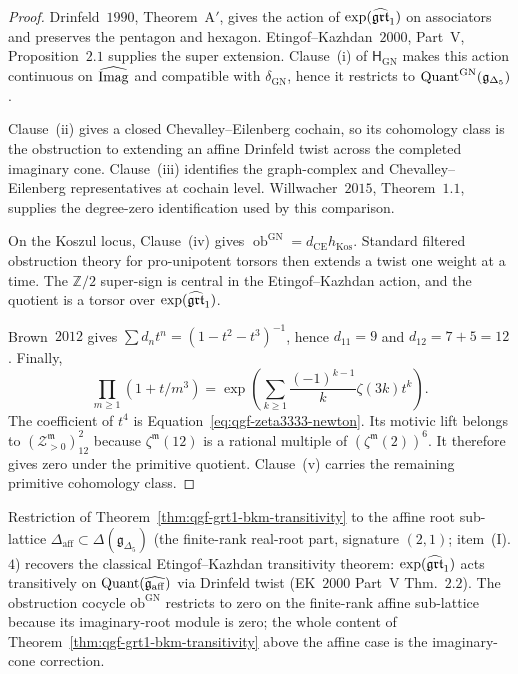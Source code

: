 \begin{proof}
Drinfeld~$1990$, Theorem~A$'$, gives the action of
$\exp(\widehat{\mathfrak{grt}}_1)$ on associators and preserves the pentagon and
hexagon.  Etingof--Kazhdan~$2000$, Part~V, Proposition~$2.1$ supplies
the super extension.  Clause~\textup{(i)} of
$\mathsf H_{\mathrm{GN}}$ makes this action continuous on
$\widehat{\mathrm{Imag}}$ and compatible with $\delta_{\mathrm{GN}}$, hence it
restricts to $\mathrm{Quant}^{\mathrm{GN}}(\mathfrak g_{\Delta_5})$.

Clause~\textup{(ii)} gives a closed Chevalley--Eilenberg cochain, so
its cohomology class is the obstruction to extending an affine
Drinfeld twist across the completed imaginary cone.  Clause~\textup{(iii)}
identifies the graph-complex and Chevalley--Eilenberg representatives
at cochain level.  Willwacher~$2015$, Theorem~$1.1$, supplies the
degree-zero identification used by this comparison.

On the Koszul locus, Clause~\textup{(iv)} gives
$\operatorname{ob}^{\mathrm{GN}}=d_{\mathrm{CE}}h_{\mathrm{Kos}}$.
Standard filtered obstruction theory for pro-unipotent torsors then
extends a twist one weight at a time.  The $\mathbb Z/2$ super-sign is
central in the Etingof--Kazhdan action, and the quotient is a torsor
over $\exp(\widehat{\mathfrak{grt}}_1)$.

Brown~$2012$ gives
$\sum d_nt^n=(1-t^2-t^3)^{-1}$, hence
$d_{11}=9$ and $d_{12}=7+5=12$.  Finally,
\[
 \prod_{m\geq1}(1+t/m^3)
 =\exp\!\left(\sum_{k\geq1}
 \frac{(-1)^{k-1}}{k}\zeta(3k)t^k\right).
\]
The coefficient of $t^4$ is
Equation~\eqref{eq:qgf-zeta3333-newton}.  Its motivic lift belongs to
$(\mathcal Z^{\mathfrak m}_{>0})^2_{12}$ because
$\zeta^{\mathfrak m}(12)$ is a rational multiple of
$(\zeta^{\mathfrak m}(2))^6$.  It therefore gives zero under the
primitive quotient.  Clause~\textup{(v)} carries the remaining
primitive cohomology class.
\end{proof}

\begin{corollary}
\label{cor:qgf-grt1-affine-recovery}
Restriction of Theorem~\ref{thm:qgf-grt1-bkm-transitivity} to the
affine root sub-lattice $\Delta_{\mathrm{aff}}\subset
\Delta(\mathfrak g_{\Delta_5})$ (the finite-rank real-root part,
signature $(2, 1)$; item~(I).$4$) recovers the classical
Etingof--Kazhdan transitivity theorem: $\exp(\widehat{\mathfrak{grt}}_1)$ acts
transitively on $\mathrm{Quant}(\widehat{\mathfrak g_{\mathrm{aff}}})$ via
Drinfeld twist (EK~$2000$ Part~V Thm.~$2.2$). The obstruction
cocycle $\mathrm{ob}^{\mathrm{GN}}$ restricts to zero on the
finite-rank affine sub-lattice because its imaginary-root module is
zero; the whole content of
Theorem~\ref{thm:qgf-grt1-bkm-transitivity} above the affine case
is the imaginary-cone correction.
\end{corollary}

